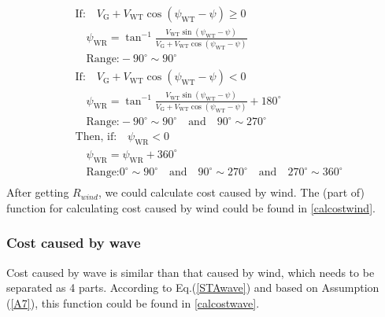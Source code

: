 \begin{equation*}
    \begin{aligned}
        &\text{If:} \quad V_{\mathrm{G}}+V_{\mathrm{WT}} \cos \left(\psi_{\mathrm{WT}}-\psi\right) \geq 0\\
        &\quad \psi_{\mathrm{WR}}=\tan ^{-1} \frac{V_{\mathrm{WT}} \sin \left(\psi_{\mathrm{WT}}-\psi\right)}  {V_{\mathrm{G}}+V_{\mathrm{WT}} \cos \left(\psi_{\mathrm{WT}}-\psi\right)} \\
        &\quad \text{Range:} -90^{\circ} \sim 90^{\circ} \\
        &\text{If:} \quad V_{\mathrm{G}}+V_{\mathrm{WT}} \cos \left(\psi_{\mathrm{WT}}-\psi\right)<0\\
        &\quad \psi_{\mathrm{WR}}=\tan ^{-1} \frac{V_{\mathrm{WT}} \sin \left(\psi_{\mathrm{WT}}-\psi\right)}{V_{\mathrm{G}}+V_{\mathrm{WT}} \cos \left(\psi_{\mathrm{WT}}-\psi\right)}+180^{\circ} \\
        &\quad \text{Range:} -90^{\circ} \sim 90^{\circ} \quad \text{and} \quad 90^{\circ} \sim 270^{\circ} \\
        &\text{Then, if:} \quad \psi_{\mathrm{WR}} < 0\\
        &\quad \psi_{\mathrm{WR}}=\psi_{\mathrm{WR}}+360^{\circ}\\
        &\quad \text{Range:} 0^{\circ} \sim 90^{\circ} \quad \text{and} \quad 90^{\circ} \sim 270^{\circ} \quad \text{and} \quad 270^{\circ} \sim 360^{\circ}\\
    \end{aligned}
\end{equation*}
After getting $R_{wind}$, we could calculate cost caused by wind. The (part of) function for calculating cost caused by wind could be found in \autoref{calcostwind}.
\subsubsection{Cost caused by wave}
\label{Cost Wave}
Cost caused by wave is similar than that caused by wind, which needs to be separated as 4 parts. According to Eq.(\ref{STAwave}) and based on Assumption (\ref{A7}), this function could be found in \autoref{calcostwave}.
